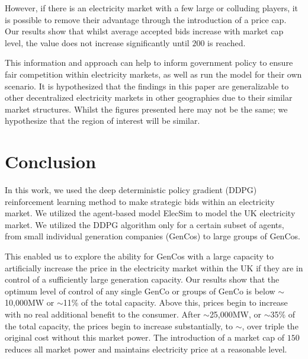 \documentclass[conference]{IEEEtran}
\begin{document}
However, if there is an electricity market with a few large or colluding players, it is possible to remove their advantage through the introduction of a price cap. Our results show that whilst average accepted bids increase with market cap level, the value does not increase significantly until \textsterling$200$ is reached.


This information and approach can help to inform government policy to ensure fair competition within electricity markets, as well as run the model for their own scenario. It is hypothesized that the findings in this paper are generalizable to other decentralized electricity markets in other geographies due to their similar market structures. Whilst the figures presented here may not be the same; we hypothesize that the region of interest will be similar.



\section{Conclusion}
\label{sec:conclusion}

In this work, we used the deep deterministic policy gradient (DDPG) reinforcement learning method to make strategic bids within an electricity market. We utilized the agent-based model ElecSim to model the UK electricity market. We utilized the DDPG algorithm only for a certain subset of agents, from small individual generation companies (GenCos) to large groups of GenCos. 

This enabled us to explore the ability for GenCos with a large capacity to artificially increase the price in the electricity market within the UK if they are in control of a sufficiently large generation capacity. Our results show that the optimum level of control of any single GenCo or groups of GenCo is below ${\sim}$10,000MW or ${\sim}$11\% of the total capacity. Above this, prices begin to increase with no real additional benefit to the consumer. After ${\sim}$25,000MW, or ${\sim}$35\% of the total capacity, the prices begin to increase substantially, to ${\sim}$, over triple the original cost without this market power. The introduction of a market cap of \textsterling$150$ reduces all market power and maintains electricity price at a reasonable level.
\end{document}
